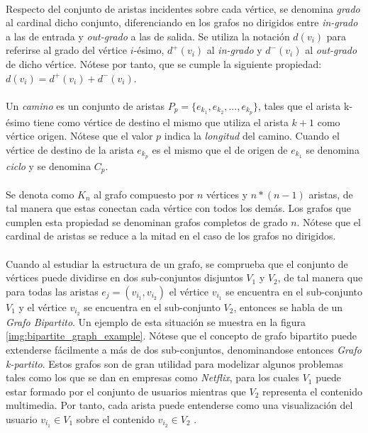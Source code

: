 \documentclass{subfiles}
\begin{document}
      \paragraph{}
      Respecto del conjunto de aristas incidentes sobre cada vértice, se denomina \emph{grado} al cardinal dicho conjunto, diferenciando en los grafos no dirigidos entre \emph{in-grado} a las de entrada y \emph{out-grado} a las de salida. Se utiliza la notación $d(v_i)$ para referirse al grado del vértice $i$-ésimo, $d^+(v_i)$ al \emph{in-grado} y $d^-(v_i)$ al \emph{out-grado} de dicho vértice. Nótese por tanto, que se cumple la siguiente propiedad: $d(v_i) = d^+(v_i) + d^-(v_i)$.


      \paragraph{}
      Un \emph{camino} es un conjunto de aristas $P_p = \{ e_{k_1}, e_{k_2}, ..., e_{k_p}\}$, tales que el arista k-ésimo tiene como vértice de destino el mismo que utiliza el arista $k+1$ como vértice origen. Nótese que el valor $p$ indica la \emph{longitud} del camino. Cuando el vértice de destino de la arista $e_{k_p}$ es el mismo que el de origen de $e_{k_1}$ se denomina \emph{ciclo} y se denomina $C_p$.

      \paragraph{}
      Se denota como $K_n$ al grafo compuesto por $n$ vértices y $n*(n-1)$ aristas, de tal manera que estas conectan cada vértice con todos los demás. Los grafos que cumplen esta propiedad se denominan grafos completos de grado $n$. Nótese que el cardinal de aristas se reduce a la mitad en el caso de los grafos no dirigidos.

      \paragraph{}
      Cuando al estudiar la estructura de un grafo, se comprueba que el conjunto de vértices puede dividirse en dos sub-conjuntos disjuntos $V_1$ y $V_2$, de tal manera que para todas las aristas $e_j = (v_{i_1}, v_{i_2})$ el vértice $v_{i_1}$ se encuentra en el sub-conjunto $V_1$ y el vértice $v_{i_2}$ se encuentra en el sub-conjunto $V_2$, entonces se habla de un \emph{Grafo Bipartito}. Un ejemplo de esta situación se muestra en la figura \ref{img:bipartite_graph_example}. Nótese que el concepto de grafo bipartito puede extenderse fácilmente a más de dos sub-conjuntos, denominandose entonces \emph{Grafo k-partito}. Estos grafos son de gran utilidad para modelizar algunos problemas tales como los que se dan en empresas como \emph{Netflix}, para los cuales $V_1$ puede estar formado por el conjunto de usuarios mientras que $V_2$ representa el contenido multimedia. Por tanto, cada arista puede entenderse como una visualización del usuario $v_{i_1} \in V_1$ sobre el contenido $v_{i_2} \in V_2$ .
\end{document}
